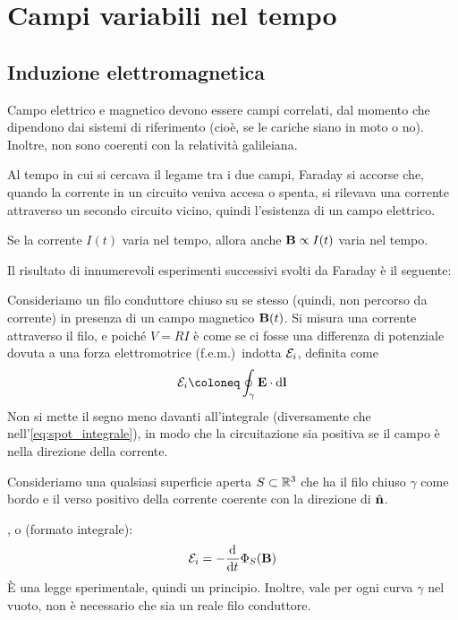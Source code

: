 \chapter{Campi variabili nel tempo}

\section{Induzione elettromagnetica}

Campo elettrico e magnetico devono essere campi correlati, dal momento che dipendono dai sistemi di riferimento (cioè, se le cariche siano in moto o no).
Inoltre, non sono coerenti con la relatività galileiana.

Al tempo in cui si cercava il legame tra i due campi, Faraday si accorse che, quando la corrente in un circuito veniva accesa o spenta, si rilevava una corrente attraverso un secondo circuito vicino, quindi l'esistenza di un campo elettrico.

Se la corrente $I(t)$ varia nel tempo, allora anche $\mathbf{B} \propto I(t)$ varia nel tempo.

Il risultato di innumerevoli esperimenti successivi svolti da Faraday è il seguente:

Consideriamo un filo conduttore chiuso su se stesso (quindi, non percorso da corrente) in presenza di un campo magnetico $\mathbf{B}(t)$.
Si misura una corrente attraverso il filo, e poiché $V = RI$ è come se ci fosse una differenza di potenziale dovuta a una forza elettromotrice (f.e.m.)\ indotta $\mathcal{E}_i$, definita come
\begin{equation}
    \fem_i \coloneq \oint_\gamma \E \lde
\end{equation}
Non si mette il segno meno davanti all'integrale (diversamente che nell'\cref{eq:spot_integrale}), in modo che la circuitazione sia positiva se il campo è nella direzione della corrente.

Consideriamo una qualsiasi superficie aperta $S \subset \mathbb{R}^3$ che ha il filo chiuso $\gamma$ come bordo e il verso positivo della corrente coerente con la direzione di $\hat{\mathbf{n}}$.

, o  (formato integrale):
\begin{equation}
    \fem_i = - \der{t} \Phi_S(\B)
\end{equation}
È una legge sperimentale, quindi un principio.
Inoltre, vale per ogni curva $\gamma$ nel vuoto, non è necessario che sia un reale filo conduttore.

